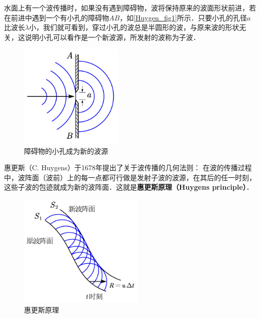 
水面上有一个波传播时，如果没有遇到障碍物，波将保持原来的波面形状前进，若在前进中遇到一个有小孔的障碍物$AB$，如\autoref{Huygen_fig1}所示．只要小孔的孔径$a $比波长$\lambda$小，我们就可看到，穿过小孔的波总是半圆形的波，与原来波的形状无关，这说明小孔可以看作是一个新波源，所发射的波称为子波．

\begin{figure}[ht]
\centering
\includegraphics[width=5cm]{./figures/Huygen_1.pdf}
\caption{障碍物的小孔成为新的波源} \label{Huygen_fig1}
\end{figure}

惠更斯（C. Huygens）于1678年提出了关于波传播的几何法则： 在波的传播过程中，波阵面（波前）上的每一点都可行做是发射子波的波源，在其后的任一时刻，这些子波的包迹就成为新的波阵面．这就是\textbf{惠更斯原理（Huygens principle）}．
\begin{figure}[ht]
\centering
\includegraphics[width=6cm]{./figures/Huygen_2.pdf}
\caption{惠更斯原理} \label{Huygen_fig2}
\end{figure}

